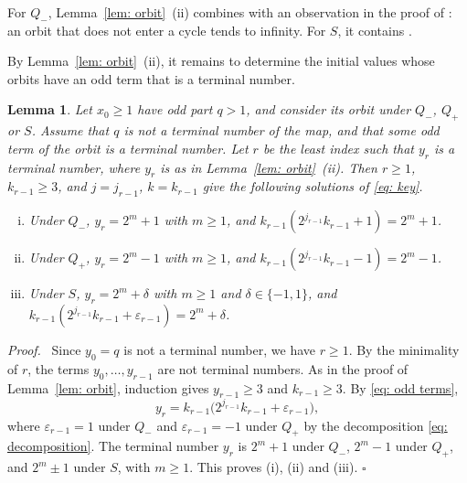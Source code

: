 \documentclass{article}
\newtheorem{lemma}{Lemma}
\newenvironment{proof}[1][Proof]{\par\medskip\noindent\textit{#1.}\ }{\hfill$\square$\par\medskip}
\newcommand{\Ge}{\geqslant}
\begin{document}
For $Q_-$, Lemma~\ref{lem: orbit}~(ii) combines \citep[Theorem~2]{sedaghat2020bounded} with an observation in the proof of \citep[Theorem~3]{sedaghat2020dual}: an orbit that does not enter a cycle tends to infinity. For $S$, it contains \citep[Theorem~7]{sedaghat2020bounded}.

By Lemma~\ref{lem: orbit}~(ii), it remains to determine the initial values whose orbits have an odd term that is a terminal number.

\begin{lemma}
\label{lem: reduction}
    Let $x_0 \Ge 1$ have odd part $q > 1$, and consider its orbit under $Q_-$, $Q_+$ or $S$. Assume that $q$ is not a terminal number of the map, and that some odd term of the orbit is a terminal number. Let $r$ be the least index such that $y_r$ is a terminal number, where $y_r$ is as in Lemma~\ref{lem: orbit}~(ii). Then $r \Ge 1$, $k_{r-1} \Ge 3$, and $j = j_{r-1}$, $k = k_{r-1}$ give the following solutions of \eqref{eq: key}.
    \begin{enumerate}[(i)]
        \setlength{\itemsep}{0pt}
        \item Under $Q_-$, $y_r = 2^m + 1$ with $m \Ge 1$, and $k_{r-1} (2^{j_{r-1}} k_{r-1} + 1) = 2^m + 1$.
        \item Under $Q_+$, $y_r = 2^m - 1$ with $m \Ge 1$, and $k_{r-1} (2^{j_{r-1}} k_{r-1} - 1) = 2^m - 1$.
        \item Under $S$, $y_r = 2^m + \delta$ with $m \Ge 1$ and $\delta \in \{-1, 1\}$, and $k_{r-1} (2^{j_{r-1}} k_{r-1} + \varepsilon_{r-1}) = 2^m + \delta$.
    \end{enumerate}
\end{lemma}

\begin{proof}
    Since $y_0 = q$ is not a terminal number, we have $r \Ge 1$. By the minimality of $r$, the terms $y_0, \dots, y_{r-1}$ are not terminal numbers. As in the proof of Lemma~\ref{lem: orbit}, induction gives $y_{r-1} \Ge 3$ and $k_{r-1} \Ge 3$. By \eqref{eq: odd terms},
    \begin{equation*}
        y_r = k_{r-1} \bigl( 2^{j_{r-1}} k_{r-1} + \varepsilon_{r-1} \bigr) ,
    \end{equation*}
    where $\varepsilon_{r-1} = 1$ under $Q_-$ and $\varepsilon_{r-1} = -1$ under $Q_+$ by the decomposition \eqref{eq: decomposition}. The terminal number $y_r$ is $2^m + 1$ under $Q_-$, $2^m - 1$ under $Q_+$, and $2^m \pm 1$ under $S$, with $m \Ge 1$. This proves (i), (ii) and (iii).
\end{proof}
\end{document}
